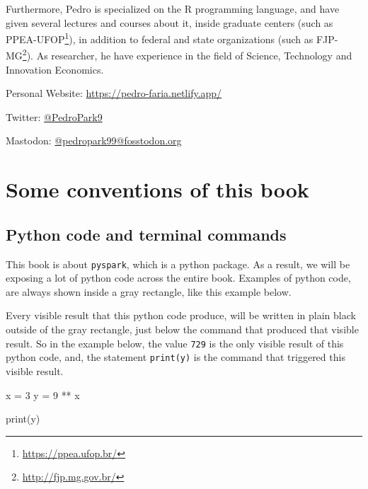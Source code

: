 \documentclass[
  11pt,
  letterpaper,
  DIV=11,
  numbers=noendperiod]{scrreprt}
\newenvironment{Shaded}{\begin{snugshade}}{\end{snugshade}}
\newcommand{\BuiltInTok}[1]{\textcolor[rgb]{0.00,0.23,0.31}{#1}}
\newcommand{\DecValTok}[1]{\textcolor[rgb]{0.68,0.00,0.00}{#1}}
\newcommand{\NormalTok}[1]{\textcolor[rgb]{0.00,0.23,0.31}{#1}}
\newcommand{\OperatorTok}[1]{\textcolor[rgb]{0.37,0.37,0.37}{#1}}
\begin{document}
Furthermore, Pedro is specialized on the R programming language, and
have given several lectures and courses about it, inside graduate
centers (such as PPEA-UFOP\footnote{\url{https://ppea.ufop.br/}}), in
addition to federal and state organizations (such as FJP-MG\footnote{\url{http://fjp.mg.gov.br/}}).
As researcher, he have experience in the field of Science, Technology
and Innovation Economics.

Personal Website: \url{https://pedro-faria.netlify.app/}

Twitter: \href{https://twitter.com/PedroPark9}{@PedroPark9}

Mastodon:
\href{https://fosstodon.org/@pedropark99}{@pedropark99@fosstodon.org}

\hypertarget{some-conventions-of-this-book}{%
\section*{Some conventions of this
book}\label{some-conventions-of-this-book}}


\hypertarget{python-code-and-terminal-commands}{%
\subsection*{Python code and terminal
commands}\label{python-code-and-terminal-commands}}

This book is about \texttt{pyspark}, which is a python package. As a
result, we will be exposing a lot of python code across the entire book.
Examples of python code, are always shown inside a gray rectangle, like
this example below.

Every visible result that this python code produce, will be written in
plain black outside of the gray rectangle, just below the command that
produced that visible result. So in the example below, the value
\texttt{729} is the only visible result of this python code, and, the
statement \texttt{print(y)} is the command that triggered this visible
result.

\begin{Shaded}
\begin{Highlighting}[]
\NormalTok{x }\OperatorTok{=} \DecValTok{3}
\NormalTok{y }\OperatorTok{=} \DecValTok{9} \OperatorTok{**}\NormalTok{ x}

\BuiltInTok{print}\NormalTok{(y)}
\end{Highlighting}
\end{Shaded}
\end{document}
